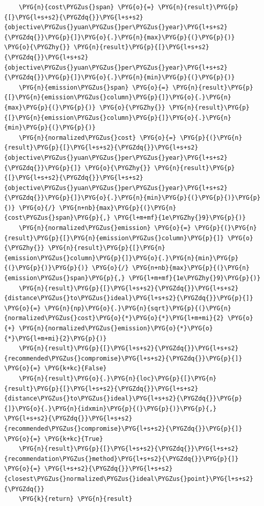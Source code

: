 \begin{Verbatim}
    \PYG{n}{cost\PYGZus{}span} \PYG{o}{=} \PYG{n}{result}\PYG{p}{[}\PYG{l+s+s2}{\PYGZdq{}}\PYG{l+s+s2}{objective\PYGZus{}yuan\PYGZus{}per\PYGZus{}year}\PYG{l+s+s2}{\PYGZdq{}}\PYG{p}{]}\PYG{o}{.}\PYG{n}{max}\PYG{p}{(}\PYG{p}{)} \PYG{o}{\PYGZhy{}} \PYG{n}{result}\PYG{p}{[}\PYG{l+s+s2}{\PYGZdq{}}\PYG{l+s+s2}{objective\PYGZus{}yuan\PYGZus{}per\PYGZus{}year}\PYG{l+s+s2}{\PYGZdq{}}\PYG{p}{]}\PYG{o}{.}\PYG{n}{min}\PYG{p}{(}\PYG{p}{)}
    \PYG{n}{emission\PYGZus{}span} \PYG{o}{=} \PYG{n}{result}\PYG{p}{[}\PYG{n}{emission\PYGZus{}column}\PYG{p}{]}\PYG{o}{.}\PYG{n}{max}\PYG{p}{(}\PYG{p}{)} \PYG{o}{\PYGZhy{}} \PYG{n}{result}\PYG{p}{[}\PYG{n}{emission\PYGZus{}column}\PYG{p}{]}\PYG{o}{.}\PYG{n}{min}\PYG{p}{(}\PYG{p}{)}
    \PYG{n}{normalized\PYGZus{}cost} \PYG{o}{=} \PYG{p}{(}\PYG{n}{result}\PYG{p}{[}\PYG{l+s+s2}{\PYGZdq{}}\PYG{l+s+s2}{objective\PYGZus{}yuan\PYGZus{}per\PYGZus{}year}\PYG{l+s+s2}{\PYGZdq{}}\PYG{p}{]} \PYG{o}{\PYGZhy{}} \PYG{n}{result}\PYG{p}{[}\PYG{l+s+s2}{\PYGZdq{}}\PYG{l+s+s2}{objective\PYGZus{}yuan\PYGZus{}per\PYGZus{}year}\PYG{l+s+s2}{\PYGZdq{}}\PYG{p}{]}\PYG{o}{.}\PYG{n}{min}\PYG{p}{(}\PYG{p}{)}\PYG{p}{)} \PYG{o}{/} \PYG{n+nb}{max}\PYG{p}{(}\PYG{n}{cost\PYGZus{}span}\PYG{p}{,} \PYG{l+m+mf}{1e\PYGZhy{}9}\PYG{p}{)}
    \PYG{n}{normalized\PYGZus{}emission} \PYG{o}{=} \PYG{p}{(}\PYG{n}{result}\PYG{p}{[}\PYG{n}{emission\PYGZus{}column}\PYG{p}{]} \PYG{o}{\PYGZhy{}} \PYG{n}{result}\PYG{p}{[}\PYG{n}{emission\PYGZus{}column}\PYG{p}{]}\PYG{o}{.}\PYG{n}{min}\PYG{p}{(}\PYG{p}{)}\PYG{p}{)} \PYG{o}{/} \PYG{n+nb}{max}\PYG{p}{(}\PYG{n}{emission\PYGZus{}span}\PYG{p}{,} \PYG{l+m+mf}{1e\PYGZhy{}9}\PYG{p}{)}
    \PYG{n}{result}\PYG{p}{[}\PYG{l+s+s2}{\PYGZdq{}}\PYG{l+s+s2}{distance\PYGZus{}to\PYGZus{}ideal}\PYG{l+s+s2}{\PYGZdq{}}\PYG{p}{]} \PYG{o}{=} \PYG{n}{np}\PYG{o}{.}\PYG{n}{sqrt}\PYG{p}{(}\PYG{n}{normalized\PYGZus{}cost}\PYG{o}{*}\PYG{o}{*}\PYG{l+m+mi}{2} \PYG{o}{+} \PYG{n}{normalized\PYGZus{}emission}\PYG{o}{*}\PYG{o}{*}\PYG{l+m+mi}{2}\PYG{p}{)}
    \PYG{n}{result}\PYG{p}{[}\PYG{l+s+s2}{\PYGZdq{}}\PYG{l+s+s2}{recommended\PYGZus{}compromise}\PYG{l+s+s2}{\PYGZdq{}}\PYG{p}{]} \PYG{o}{=} \PYG{k+kc}{False}
    \PYG{n}{result}\PYG{o}{.}\PYG{n}{loc}\PYG{p}{[}\PYG{n}{result}\PYG{p}{[}\PYG{l+s+s2}{\PYGZdq{}}\PYG{l+s+s2}{distance\PYGZus{}to\PYGZus{}ideal}\PYG{l+s+s2}{\PYGZdq{}}\PYG{p}{]}\PYG{o}{.}\PYG{n}{idxmin}\PYG{p}{(}\PYG{p}{)}\PYG{p}{,} \PYG{l+s+s2}{\PYGZdq{}}\PYG{l+s+s2}{recommended\PYGZus{}compromise}\PYG{l+s+s2}{\PYGZdq{}}\PYG{p}{]} \PYG{o}{=} \PYG{k+kc}{True}
    \PYG{n}{result}\PYG{p}{[}\PYG{l+s+s2}{\PYGZdq{}}\PYG{l+s+s2}{recommendation\PYGZus{}method}\PYG{l+s+s2}{\PYGZdq{}}\PYG{p}{]} \PYG{o}{=} \PYG{l+s+s2}{\PYGZdq{}}\PYG{l+s+s2}{closest\PYGZus{}normalized\PYGZus{}ideal\PYGZus{}point}\PYG{l+s+s2}{\PYGZdq{}}
    \PYG{k}{return} \PYG{n}{result}
\end{Verbatim}
